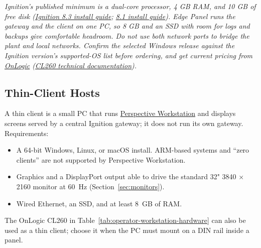 \textit{\small Ignition's published minimum is a dual-core processor, 4 GB RAM, and 10 GB of free disk (\href{https://docs.inductiveautomation.com/docs/8.3/getting-started/startup-guide/downloading-and-installing-ignition}{Ignition 8.3 install guide}; \href{https://www.docs.inductiveautomation.com/docs/8.1/getting-started/quick-start-guide/download-and-install}{8.1 install guide}). Edge Panel runs the gateway and the client on one PC, so 8 GB and an SSD with room for logs and backups give comfortable headroom. Do not use both network ports to bridge the plant and local networks. Confirm the selected Windows release against the Ignition version's supported-OS list before ordering, and get current pricing from \href{https://www.onlogic.com/store/adsk-cl260/}{OnLogic} (\href{https://support.onlogic.com/product-documentation/industrial-products/cl200-series/cl260}{CL260 technical documentation}).}

\subsection{Thin-Client Hosts}\label{sec:thin-clients}
A thin client is a small PC that runs \href{https://www.docs.inductiveautomation.com/docs/8.1/launchers-and-workstation/perspective-workstation}{Perspective Workstation} and displays screens served by a central Ignition gateway; it does not run its own gateway. Requirements:
\begin{itemize}[itemsep=1pt]
  \item A 64-bit Windows, Linux, or macOS install. ARM-based systems and ``zero clients'' are not supported by Perspective Workstation.
  \item Graphics and a DisplayPort output able to drive the standard 32" 3840 $\times$ 2160 monitor at 60~Hz (Section~\ref{sec:monitors}).
  \item Wired Ethernet, an SSD, and at least 8~GB of RAM.
\end{itemize}
The OnLogic CL260 in Table~\ref{tab:operator-workstation-hardware} can also be used as a thin client; choose it when the PC must mount on a DIN rail inside a panel.

